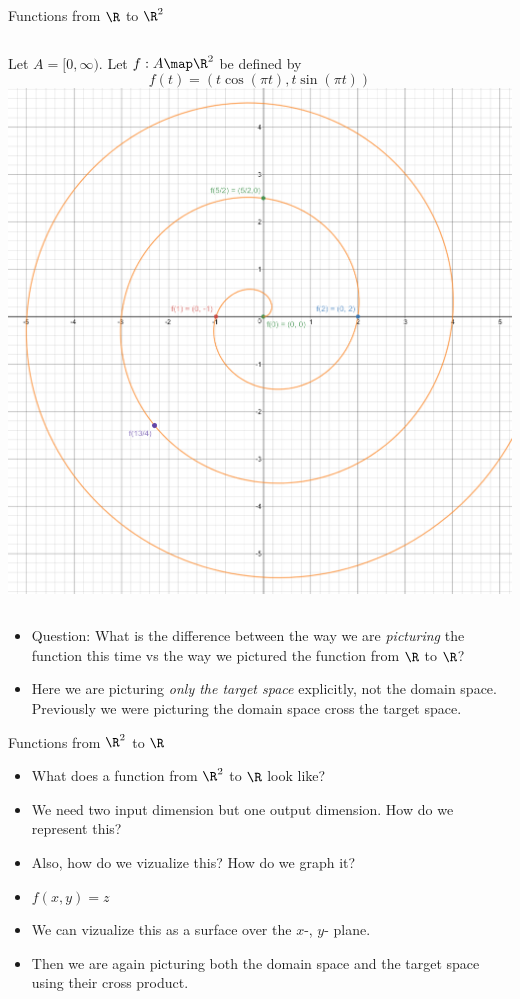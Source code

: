\documentclass{beamer}
\begin{document}
\begin{frame}{Functions from $\R$ to $\R^2$}

\begin{columns}
\column[T]{5cm}
Let $A=[0, \infty)$. Let $f:A\map \R^2$ be defined by
$$f(t) = (t \cos(\pi t), t \sin(\pi t))$$
\column[T]{5cm}
\includegraphics[scale=0.1]{spiral}
\end{columns}

\begin{itemize}
\item Question: What is the difference between the way we are \emph{picturing}
the function this time vs the way we pictured the function from
$\R$ to $\R$?
\item Here we are picturing \emph{only the target space} explicitly, not
the domain space. Previously we were picturing the domain space cross
the target space.
\end{itemize}

\end{frame}

\begin{frame}{Functions from $\R^2$ to $\R$}

\begin{itemize}
\item What does a function from $\R^2$ to $\R$ look like?
\item We need two input dimension but one output dimension.
How do we represent this?
\item Also, how do we vizualize this? How do we graph it?
\item $f(x,y) = z$
\item We can vizualize this as a surface over the $x$-, $y$- plane.
\item Then we are again picturing both the domain space and the target space
using their cross product.
\end{itemize}

\end{frame}
\end{document}
